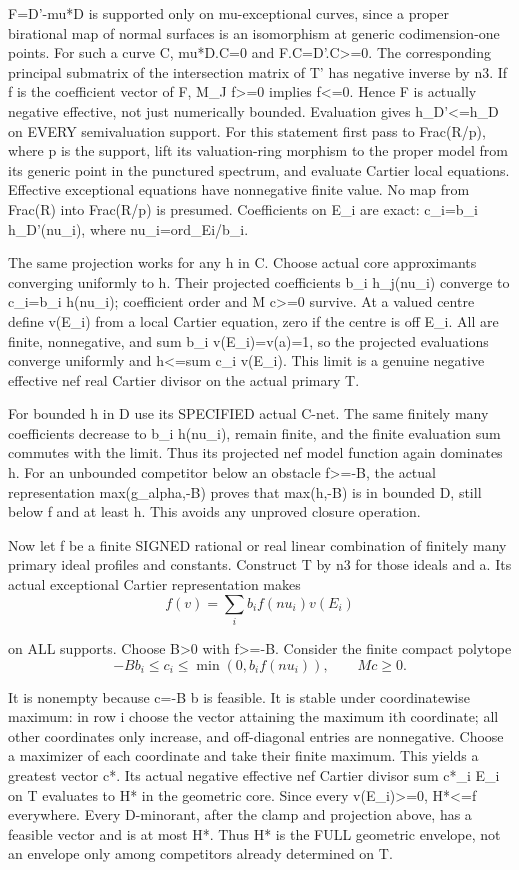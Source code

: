 \documentclass[11pt]{article}
\begin{document}
F=D'-mu*D is supported only on mu-exceptional curves, since a proper birational map of normal surfaces is an isomorphism at generic codimension-one points. For such a curve C, mu*D.C=0 and F.C=D'.C>=0. The corresponding principal submatrix of the intersection matrix of T' has negative inverse by n3. If f is the coefficient vector of F, M\_J f>=0 implies f<=0. Hence F is actually negative effective, not just numerically bounded. Evaluation gives h\_D'<=h\_D on EVERY semivaluation support. For this statement first pass to Frac(R/p), where p is the support, lift its valuation-ring morphism to the proper model from its generic point in the punctured spectrum, and evaluate Cartier local equations. Effective exceptional equations have nonnegative finite value. No map from Frac(R) into Frac(R/p) is presumed. Coefficients on E\_i are exact: c\_i=b\_i h\_D'(nu\_i), where nu\_i=ord\_Ei/b\_i.

The same projection works for any h in C. Choose actual core approximants converging uniformly to h. Their projected coefficients b\_i h\_j(nu\_i) converge to c\_i=b\_i h(nu\_i); coefficient order and M c>=0 survive. At a valued centre define v(E\_i) from a local Cartier equation, zero if the centre is off E\_i. All are finite, nonnegative, and sum b\_i v(E\_i)=v(a)=1, so the projected evaluations converge uniformly and h<=sum c\_i v(E\_i). This limit is a genuine negative effective nef real Cartier divisor on the actual primary T.

For bounded h in D use its SPECIFIED actual C-net. The same finitely many coefficients decrease to b\_i h(nu\_i), remain finite, and the finite evaluation sum commutes with the limit. Thus its projected nef model function again dominates h. For an unbounded competitor below an obstacle f>=-B, the actual representation max(g\_alpha,-B) proves that max(h,-B) is in bounded D, still below f and at least h. This avoids any unproved closure operation.

Now let f be a finite SIGNED rational or real linear combination of finitely many primary ideal profiles and constants. Construct T by n3 for those ideals and a. Its actual exceptional Cartier representation makes
\[
f(v)=\sum_i b_i f(nu_i)v(E_i)
\]

on ALL supports. Choose B>0 with f>=-B. Consider the finite compact polytope
\[
-B b_i\le c_i\le\min(0,b_i f(nu_i)),\qquad M c\ge0.
\]

It is nonempty because c=-B b is feasible. It is stable under coordinatewise maximum: in row i choose the vector attaining the maximum ith coordinate; all other coordinates only increase, and off-diagonal entries are nonnegative. Choose a maximizer of each coordinate and take their finite maximum. This yields a greatest vector c*. Its actual negative effective nef Cartier divisor sum c*\_i E\_i on T evaluates to H* in the geometric core. Since every v(E\_i)>=0, H*<=f everywhere. Every D-minorant, after the clamp and projection above, has a feasible vector and is at most H*. Thus H* is the FULL geometric envelope, not an envelope only among competitors already determined on T.
\end{document}
